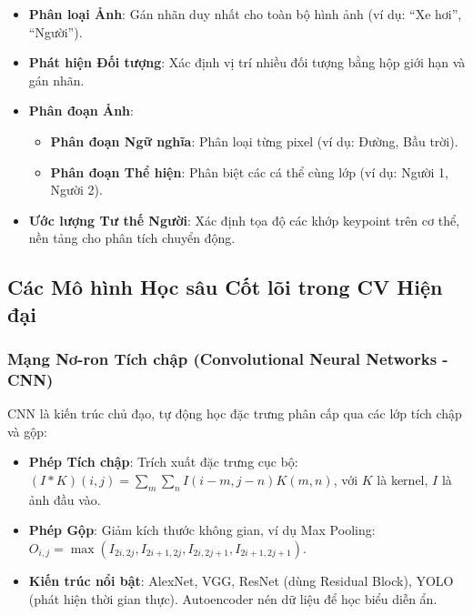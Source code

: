 \begin{itemize}
    \item \textbf{Phân loại Ảnh}: Gán nhãn duy nhất cho toàn bộ hình ảnh (ví dụ: ``Xe hơi'', ``Người'').\autocite{krizhevsky2012}
    \item \textbf{Phát hiện Đối tượng}: Xác định vị trí nhiều đối tượng bằng hộp giới hạn và gán nhãn.\autocite{redmon2016}
    \item \textbf{Phân đoạn Ảnh}:
    \begin{itemize}
        \item \textbf{Phân đoạn Ngữ nghĩa}: Phân loại từng pixel (ví dụ: Đường, Bầu trời).\autocite{ronneberger2015}
        \item \textbf{Phân đoạn Thể hiện}: Phân biệt các cá thể cùng lớp (ví dụ: Người 1, Người 2).\autocite{ronneberger2015}
    \end{itemize}
    \item \textbf{Ước lượng Tư thế Người}: Xác định tọa độ các khớp keypoint trên cơ thể, nền tảng cho phân tích chuyển động.\autocite{lin2014}
\end{itemize}

\subsection{Các Mô hình Học sâu Cốt lõi trong CV Hiện đại}
\subsubsection{Mạng Nơ-ron Tích chập (Convolutional Neural Networks - CNN)}
CNN là kiến trúc chủ đạo, tự động học đặc trưng phân cấp qua các lớp tích chập và gộp:

\begin{itemize}
    \item \textbf{Phép Tích chập}: Trích xuất đặc trưng cục bộ: $(I * K)(i, j) = \sum_{m} \sum_{n} I(i-m, j-n) K(m, n)$, với $K$ là kernel, $I$ là ảnh đầu vào.\autocite{lecun1998}
    \item \textbf{Phép Gộp}: Giảm kích thước không gian, ví dụ Max Pooling: $O_{i,j} = \max \left( I_{2i, 2j}, I_{2i+1, 2j}, I_{2i, 2j+1}, I_{2i+1, 2j+1} \right)$.\autocite{lecun1998}
    \item \textbf{Kiến trúc nổi bật}: AlexNet, VGG, ResNet (dùng Residual Block), YOLO (phát hiện thời gian thực).\autocite{krizhevsky2012,simonyan2014,he2016,redmon2016} Autoencoder nén dữ liệu để học biểu diễn ẩn.\autocite{szeliski2010}
\end{itemize}


